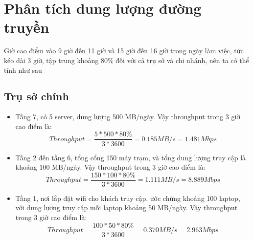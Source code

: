 \documentclass[a4paper]{article}
\begin{document}
\begin{table}[H]
\centering
{}
\caption{Bảng số lượng các thiết bị sử dụng}
\label{tab:tong_ket_thiet_bi}
\end{table}


\section{Phân tích dung lượng đường truyền}
Giờ cao điểm vào 9 giờ đến 11 giờ và 15 giờ đến 16 giờ trong ngày làm việc, tức kéo dài 3 giờ, tập trung khoảng 80\% đối với cả trụ sở và chi nhánh, nên ta có thể tính như sau

\subsection{Trụ sở chính}
\begin{itemize}
    \item Tầng 7, có 5 server, dung lượng 500 MB/ngày. Vậy throughput trong 3 giờ cao điểm là:\\
    \[Throughput = \frac{5 * 500 * 80\%}{3 * 3600} = 0.185 MB/s = 1.481 Mbps\]
    \item Tầng 2 đến tầng 6, tổng cổng 150 máy trạm, và tổng dung lượng truy cập là khoảng 100 MB/ngày. Vậy throughput trong 3 giờ cao điểm là:\\
    \[Throughput = \frac{150 * 100 * 80\%}{3 * 3600} = 1.111 MB/s = 8.889 Mbps\]
    \item Tầng 1, nơi lắp đặt wifi cho khách truy cập, ước chừng khoảng 100 laptop, với dung lượng truy cập mỗi laptop khoảng 50 MB/ngày. Vậy throughput trong 3 giờ cao điểm là:\\
    \[Throughput = \frac{100 * 50 * 80\%}{3 * 3600} = 0.370 MB/s = 2.963 Mbps\]
\end{itemize}
\end{document}
